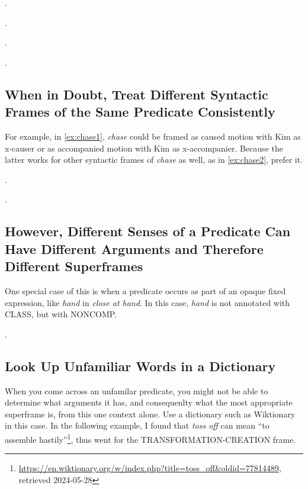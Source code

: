 \documentclass[a4paper]{article}
\newcommand{\fr}[1]{\textsf{#1}}
\newcommand{\rl}[1]{\textsf{#1}}
\begin{document}
\ex.\label{ex:cut1}

\ex.\label{ex:cut2}

\ex.\label{ex:high1}

\ex.\label{ex:high2}


\newpage\subsection{When in Doubt, Treat Different Syntactic Frames of the Same Predicate Consistently}

For example, in \ref{ex:chase1}, \emph{chase} could be framed as caused motion
with Kim as \rl{x-causer} or as accompanied motion with Kim as
\rl{x-accompanier}. Because the latter works for other syntactic frames of
\emph{chase} as well, as in \ref{ex:chase2}, prefer it.

\ex.\label{ex:chase1}

\ex.\label{ex:chase2}


\newpage\subsection{However, Different Senses of a Predicate Can Have Different Arguments and Therefore Different Superframes}

One special case of this is when a predicate occurs as part of an opaque fixed
expression, like \emph{hand} in \emph{close at hand}. In this case, \emph{hand}
is not annotated with \fr{CLASS}, but with \fr{NONCOMP}.

\ex.


\newpage\subsection{Look Up Unfamiliar Words in a Dictionary}

When you come across an unfamilar predicate, you might not be able to determine
what arguments it has, and consequenlty what the most appropriate superframe is,
from this one context alone. Use a dictionary such as Wiktionary in this case.
In the following example, I found that \emph{toss off} can mean ``to assemble
hastily''\footnote{\url{https://en.wiktionary.org/w/index.php?title=toss\_off\&oldid=77814489}, retrieved 2024-05-28},
thus went for the \fr{TRANSFORMATION-CREATION} frame.
\end{document}
